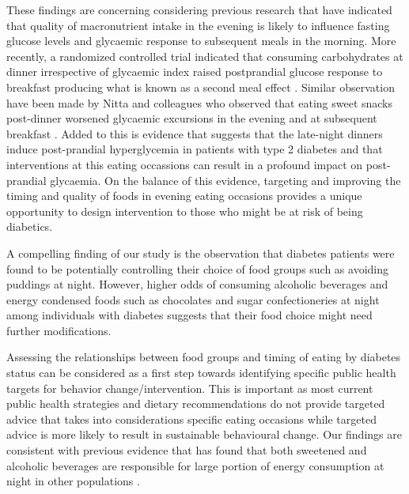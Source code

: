 \documentclass{bmcart}
\begin{document}
These findings are concerning considering previous research that have indicated that quality of macronutrient intake in the evening is likely to influence fasting glucose levels and glycaemic response to subsequent meals in the morning. \cite{Wolever1988} More recently, a randomized controlled trial indicated that consuming carbohydrates at dinner irrespective of glycaemic index raised postprandial glucose response to breakfast producing what is known as a second meal effect \cite{Haldar2020}. Similar observation have been made by Nitta and colleagues who observed that eating sweet snacks post-dinner worsened glycaemic excursions in the evening and at subsequent breakfast \cite{Nitta2019}. Added to this is evidence that suggests that the late-night dinners induce post-prandial hyperglycemia in patients with type 2 diabetes and that interventions at this eating occassions can result in a profound impact on post-prandial glycaemia. On the balance of this evidence, targeting and improving the timing and quality of foods in evening eating occasions provides a unique opportunity to design intervention to those who might be at risk of being diabetics. 


A compelling finding of our study is the observation that diabetes patients were found to be potentially controlling their choice of food groups such as avoiding puddings at night. However, higher odds of consuming alcoholic beverages and energy condensed foods such as chocolates and sugar confectioneries at night among individuals with diabetes suggests that their food choice might need further modifications. 

Assessing the relationships between food groups and timing of eating by diabetes status can be considered as a first step towards identifying specific public health targets for behavior change/intervention. This is important as most current public health strategies and dietary recommendations do not provide targeted advice that takes into considerations specific eating occasions while targeted advice is more likely to result in sustainable behavioural change. Our findings are consistent with previous evidence that has found that both sweetened and alcoholic beverages are responsible for large portion of energy consumption at night in other populations \cite{Hassen2018}. 
\end{document}
